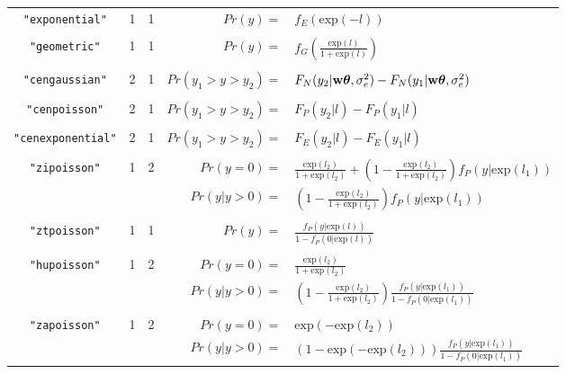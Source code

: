 \documentclass{article}
\begin{document}
\begin{landscape}
\begin{longtable}{cccrl}
   \texttt{"exponential"}         &  1  &   1  &         $Pr(y)=$&$ f_{E}(\textrm{exp}(-l))$\\      
&&&&\\
   \texttt{"geometric"}         &  1  &   1  &         $Pr(y)=$&$ f_{G}(\frac{\textrm{exp}(l)}{1+\textrm{exp}(l)})$\\      
&&&&\\
   \texttt{"cengaussian"}        &  2 &   1  &        $Pr(y_{1}>y>y_{2}) =$&$ F_{N}(y_{2} | {\bf w}{\bm \theta},\sigma^{2}_{e})-F_{N}( y_{1} | {\bf w}{\bm \theta},\sigma^{2}_{e})$\\
&&&&\\
   \texttt{"cenpoisson"}        &  2  &   1  &        $Pr(y_{1}>y>y_{2}) =$&$ F_{P}(y_{2} | l)-F_{P}(y_{1} | l)$\\
&&&&\\
   \texttt{"cenexponential"}     &2    &  1  &          $Pr(y_{1}>y>y_{2}) =$&$ F_{E}(y_{2} | l)-F_{E}(y_{1} | l)$\\  
&&&&\\  
   \texttt{"zipoisson"}        &  1  &   2  &     $Pr(y=0) =$&$ \frac{\textrm{exp}(l_{2})}{1+\textrm{exp}(l_{2})}+\left(1-\frac{\textrm{exp}(l_{2})}{1+\textrm{exp}(l_{2})}\right)f_{P}(y|\textrm{exp}(l_{1}))$\\     
                                              &    &       & $Pr(y | y>0) =$&$ \left(1-\frac{\textrm{exp}(l_{2})}{1+\textrm{exp}(l_{2})}\right)f_{P}(y |\textrm{exp}(l_{1}))$\\      
&&&&\\
   \texttt{"ztpoisson"}         &  1  &   1  &         $Pr(y)=$&$ \frac{f_{P}(y |\textrm{exp}(l))}{1-f_{P}(0 |\textrm{exp}(l))}$\\      
&&&&\\
   \texttt{"hupoisson"}        &  1  &   2  &     $Pr(y=0) =$&$ \frac{\textrm{exp}(l_{2})}{1+\textrm{exp}(l_{2})}$\\     
                               &    &       & $Pr(y | y>0) =$&$\left(1-\frac{\textrm{exp}(l_{2})}{1+\textrm{exp}(l_{2})}\right)\frac{f_{P}(y |\textrm{exp}(l_{1}))}{1-f_{P}(0 |\textrm{exp}(l_{1}))}$\\      
&&&&\\
   \texttt{"zapoisson"}        &  1  &   2  &     $Pr(y=0) =$&$\textrm{exp}(-\textrm{exp}(l_{2}))$\\     
                               &    &       & $Pr(y | y>0) =$&$ \left(1-\textrm{exp}(-\textrm{exp}(l_{2}))\right)\frac{f_{P}(y |\textrm{exp}(l_{1}))}{1-f_{P}(0 |\textrm{exp}(l_{1}))}$\\      

\end{longtable}
\end{landscape}
\end{document}
